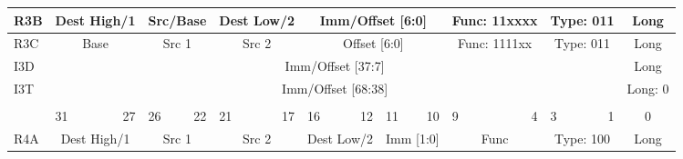 \documentclass{article}
\begin{document}
\begin{table}[H]
\begin{tabular}{|l|l|r|l|r|l|r|l|r|l|r|l|r|l|r|c|}
    \hline R3B  &   \multicolumn{2}{|c|}{Dest High/1}   &   \multicolumn{2}{|c|}{Src/Base}  &   \multicolumn{2}{|c|}{Dest Low/2}    &   \multicolumn{4}{|c|}{Imm/Offset [6:0]}  &   \multicolumn{2}{|c|}{Func: 11xxxx}  &   \multicolumn{2}{|c|}{Type: 011} &   Long \\
    
    \hline R3C  &   \multicolumn{2}{|c|}{Base}          &   \multicolumn{2}{|c|}{Src 1}     &   \multicolumn{2}{|c|}{Src 2}         &   \multicolumn{4}{|c|}{Offset [6:0]}  &   \multicolumn{2}{|c|}{Func: 1111xx}  &   \multicolumn{2}{|c|}{Type: 011} &   Long \\
    
    \hline I3D  &   \multicolumn{14}{|c|}{Imm/Offset [37:7]}    &   Long \\
    
    \hline I3T  &   \multicolumn{14}{|c|}{Imm/Offset [68:38]}   &   Long: 0 \\
    
    \hline          \multicolumn{16}{c}{} \\
    
    
    \hline      &   \multicolumn{1}{l}{31}  &   27      &   \multicolumn{1}{l}{26}  &   22  &   \multicolumn{1}{l}{21}  &   17      &   \multicolumn{1}{l}{16}  &   12      &   \multicolumn{1}{l}{11}  &   10  &   \multicolumn{1}{l}{9}   &   4   &   \multicolumn{1}{l}{3}   &   1   &   0 \\
    \hline R4A  &   \multicolumn{2}{|c|}{Dest High/1}   &   \multicolumn{2}{|c|}{Src 1}     &   \multicolumn{2}{|c|}{Src 2}         &   \multicolumn{2}{|c|}{Dest Low/2}    &   \multicolumn{2}{|c|}{Imm [1:0]} &   \multicolumn{2}{|c|}{Func}      &   \multicolumn{2}{|c|}{Type: 100} &   Long \\


\end{tabular}
\end{table}
\end{document}
